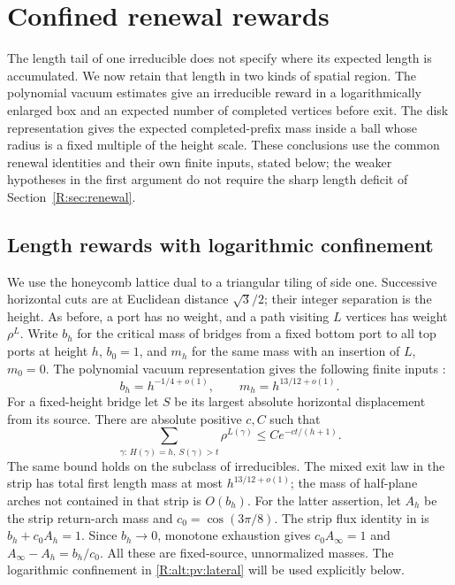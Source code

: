 \section{Confined renewal rewards}
\label{R:alt:section}

The length tail of one irreducible does not specify where its expected
length is accumulated. We now retain that length in two kinds of spatial
region. The polynomial vacuum estimates give an irreducible reward in a
logarithmically enlarged box and an expected number of completed vertices
before exit. The disk representation gives the expected completed-prefix
mass inside a ball whose radius is a fixed multiple of the height scale.
These conclusions use the common renewal identities and their own finite
inputs, stated below; the weaker hypotheses in the first argument do not
require the sharp length deficit of Section~\ref{R:sec:renewal}.

\subsection{Length rewards with logarithmic confinement}
\label{R:alt:pv}

We use the honeycomb lattice dual to a triangular tiling of side one.
Successive horizontal cuts are at Euclidean distance $\sqrt3/2$; their
integer separation is the height.  As before, a port has no weight, and a
path visiting $L$ vertices has weight $\rho^L$.  Write $b_h$ for the critical
mass of bridges from a fixed bottom port to all top ports at height $h$,
$b_0=1$, and $m_h$ for the same mass with an insertion of $L$, $m_0=0$.
The polynomial vacuum representation gives the following finite inputs
\cite[Theorem~1.1, Proposition~1.3 and Lemma~8.2]{RenewalVacuumCompanion}:
\begin{equation}\label{R:alt:pv:inputs}
 b_h=h^{-1/4+o(1)},\qquad m_h=h^{13/12+o(1)}.
\end{equation}
For a fixed-height bridge let $S$ be its largest absolute horizontal
displacement from its source.  There are absolute positive $c,C$ such that
\begin{equation}\label{R:alt:pv:lateral}
 \sum_{\gamma:\,H(\gamma)=h,\ S(\gamma)>t}\rho^{L(\gamma)}
 \le C e^{-ct/(h+1)}.
\end{equation}
The same bound holds on the subclass of irreducibles.  The mixed exit law in
the strip has total first length mass at most $h^{13/12+o(1)}$; the mass of
half-plane arches not contained in that strip is $O(b_h)$.
For the latter assertion, let $A_h$ be the strip return-arch mass and
$c_0=\cos(3\pi/8)$.  The strip flux identity in
\cite[Section~2]{RenewalVacuumCompanion} is $b_h+c_0A_h=1$.
Since $b_h\to0$, monotone exhaustion gives $c_0A_\infty=1$ and
$A_\infty-A_h=b_h/c_0$.  All these are fixed-source, unnormalized masses.  The logarithmic confinement in
\eqref{R:alt:pv:lateral} will be used explicitly below.

